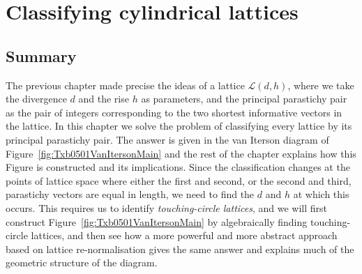 

\chapter{Classifying cylindrical lattices}
\label{ch:classifying}
	\section*{Summary}
	{
The previous chapter made precise the ideas  of a lattice  $\mathcal{L}(d,h)$, where we take the divergence $d$ and the rise $h$ as parameters, and the principal parastichy pair as the pair of integers corresponding to the two shortest informative vectors in the lattice. In this chapter  we solve the problem of classifying every lattice by its principal parastichy pair.
The answer is given in the van Iterson diagram of Figure~\ref{fig:Txb0501VanItersonMain} and the rest of the chapter explains how this Figure is constructed and its implications. 
 Since the classification changes at the points of lattice space where either the first and second, or the second and third, parastichy vectors are equal in length, we need to find the $d$ and $h$ at which this occurs. This requires us to identify \emph{touching-circle lattices}, and we will first construct Figure~\ref{fig:Txb0501VanItersonMain} by algebraically finding touching-circle lattices, and then see how a more powerful and more abstract approach based on lattice re-normalisation gives the same answer and explains much of the geometric structure of the diagram. 
}

